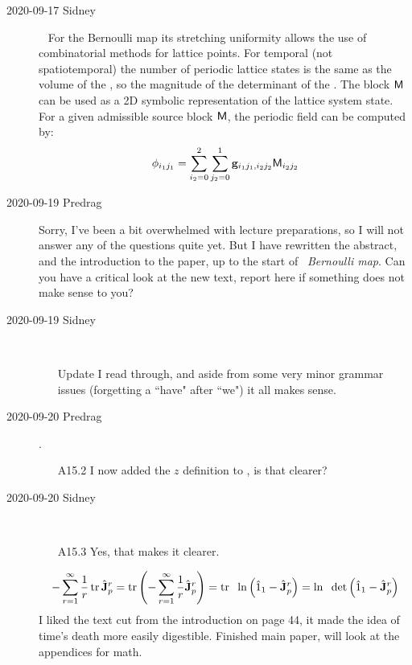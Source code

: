 \begin{description}
\item[2020-09-17 Sidney]~
For the Bernoulli map its stretching uniformity allows the use of combinatorial methods for lattice points. For temporal (not spatiotemporal) the number of periodic lattice states is the same as the volume of the {\fundPip}, so the magnitude of the determinant of the {\jacobianOrb}. The block $\mathsf{M}$ can be used as a 2D symbolic representation of the lattice system state. For a given admissible source block $\mathsf{M}$, the periodic field can be computed by:
\[
\phi_{i_1j_1}=\sum_{i_2=0}^2\sum_{j_2=0}^1\mathbf{g}_{i_1j_1,i_2j_2}\mathsf{M}_{i_2j_2}
\]


\item[2020-09-19 Predrag]
Sorry, I've been a bit overwhelmed with lecture preparations, so
I will not answer any of the questions quite yet. But I have rewritten the
abstract, and the introduction to the paper, up to
the start of ~{\em Bernoulli map}.
Can you have a critical look at the new text, report here if
something does not make sense to you?

\item[2020-09-19 Sidney]~~
\begin{itemize}
	\item[Update]
I read through, and aside from some very minor grammar issues (forgetting
a ``have" after ``we")
it all makes sense.
\end{itemize}

\item[2020-09-20 Predrag].
\begin{itemize}
	\item[A15.2]
I now added the $z$ definition to ,
is that clearer?
\end{itemize}

\item[2020-09-20 Sidney]~~
\begin{itemize}
	\item[A15.3]
Yes, that makes it clearer.
\end{itemize}
$$-\sum^{\infty}_{r=1}\frac{1}{r}\mathop{\mathrm{tr}}\nolimits\hat{\mathbf{J}}_p^r
=\mathop{\mathrm{tr}}\nolimits\left(-\sum^{\infty}_{r=1}\frac{1}{r}\hat{\mathbf{J}}_p^r\right)
= \mathop{\mathrm{tr}}\nolimits\hspace{2mm}\ln\left(\hat{1}_1-\hat{\mathbf{J}}_p^r\right)
= \ln\hspace{2mm}\det\left(\hat{1}_1-\hat{\mathbf{J}}_p^r\right)$$
I liked the text cut from the introduction on page 44, it made the idea of time's death more easily digestible. Finished main paper, will look at the appendices for math.


\end{description}
